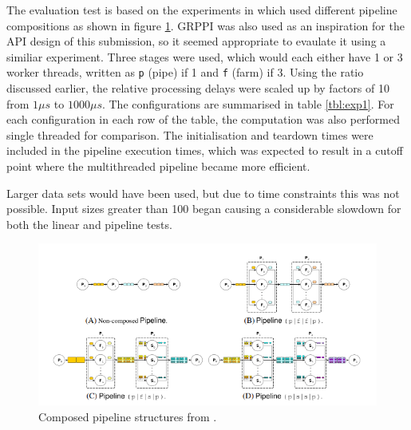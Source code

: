 \documentclass[12pt]{article}
\def\code#1{\texttt{#1}}
\begin{document}
The evaluation test is based on the experiments in \cite{grppi} which used different pipeline compositions as shown in figure \ref{fig:grppi}. GRPPI was also used as an inspiration for the API design of this submission, so it seemed appropriate to evaulate it using a similiar experiment. Three stages were used, which would each either have 1 or 3 worker threads, written as \code{p} (pipe) if 1 and \code{f} (farm) if 3. Using the ratio discussed earlier, the relative processing delays were scaled up by factors of 10 from $1\mu s$ to $1000 \mu s$. The configurations are summarised in table \ref{tbl:exp1}. For each configuration in each row of the table, the computation was also performed single threaded for comparison. The initialisation and teardown times were included in the pipeline execution times, which was expected to result in a cutoff point where the multithreaded pipeline became more efficient. 

Larger data sets would have been used, but due to time constraints this was not possible. Input sizes greater than 100 began causing a considerable slowdown for both the linear and pipeline tests.

\begin{figure}[!ht]
	\centering 
	\includegraphics[width=\linewidth]{images/grppi}
	\caption{Composed pipeline structures from \cite{grppi}.}
	\label{fig:grppi}
\end{figure}
\end{document}
